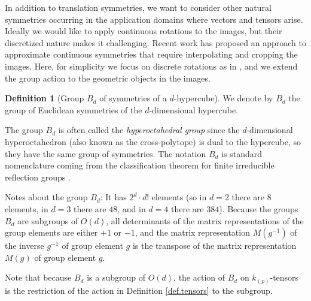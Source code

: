 \documentclass{article}
\theoremstyle{definition}
\newtheorem{definition}{Definition}
\newcommand{\tensorname}[2]{{#1}_{(#2)}}
\newcommand{\tensor}[2]{$\tensorname{#1}{#2}$-tensor}
\begin{document}
In addition to translation symmetries, we want to consider other natural symmetries occurring in the application domains where vectors and tensors arise. Ideally we would like to apply continuous rotations to the images, but their discretized nature makes it challenging. Recent work has proposed an approach to approximate continuous symmetries \cite{} that require interpolating and cropping the images. Here, for simplicity we focus on discrete rotations as in \cite{}, and we extend the group action to the geometric objects in the images.

\begin{definition}[Group $B_d$ of symmetries of a $d$-hypercube]
We denote by $B_d$ the group of Euclidean symmetries of the $d$-dimensional hypercube.
\end{definition}

The group $B_d$ is often called the {\em hyperoctahedral group} since the $d$-dimensional hyperoctahedron (also known as the cross-polytope) is dual to the hypercube, so they have the same group of symmetries. The notation $B_d$ is standard nomenclature coming from the classification theorem for finite irreducible reflection groups \cite{humphreys1990reflection}.


Notes about the group $B_d$: It has $2^d\cdot d!$ elements (so in $d=2$ there are $8$ elements, in $d=3$ there are $48$, and in $d=4$ there are $384$). Because the groups $B_d$ are subgroups of $O(d)$, all determinants of the matrix representations of the group elements are either $+1$ or $-1$, and the matrix representation $M(g^{-1})$ of the inverse $g^{-1}$ of group element $g$ is the transpose of the matrix representation $M(g)$ of group element $g$.

Note that because $B_d$ is a subgroup of $O(d)$, the action of $B_d$ on \tensor{k}{p}s is the restriction of the action in Definition \ref{def.tensors} to the subgroup.
\end{document}
